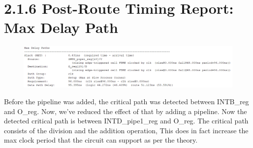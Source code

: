 \documentclass[11pt]{report}
\begin{document}
\section*{2.1.6 Post-Route Timing Report: Max Delay Path}
\begin{figure}[H]
    \includegraphics[width=\columnwidth]{Reports/Lab3/Assets/2.1.6_max-delay-path.png}
\end{figure}
Before the pipeline was added, the critical path was detected between INTB\_reg and O\_reg. Now, we've reduced the effect of that by adding a pipeline. Now the detected critical path is between INTD\_pipe1\_reg and O\_reg. The critical path consists of the division and the addition operation, This does in fact increase the max clock period that the circuit can support as per the theory.
\end{document}
